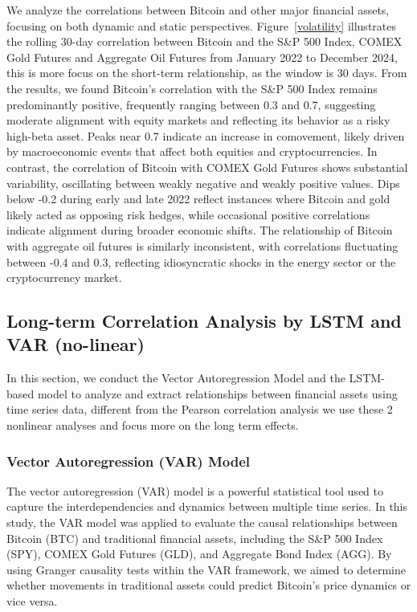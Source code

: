 \documentclass{article}
\begin{document}
We analyze the correlations between Bitcoin and other major financial assets, focusing on both dynamic and static perspectives. Figure~\ref{volatility} illustrates the rolling 30-day correlation between Bitcoin and the S\&P 500 Index, COMEX Gold Futures and Aggregate Oil Futures from January 2022 to December 2024, this is more focus on the short-term relationship, as the window is 30 days. From the results, we found Bitcoin’s correlation with the S\&P 500 Index remains predominantly positive, frequently ranging between 0.3 and 0.7, suggesting moderate alignment with equity markets and reflecting its behavior as a risky high-beta asset. Peaks near 0.7 indicate an increase in comovement, likely driven by macroeconomic events that affect both equities and cryptocurrencies. In contrast, the correlation of Bitcoin with COMEX Gold Futures shows substantial variability, oscillating between weakly negative and weakly positive values. Dips below -0.2 during early and late 2022 reflect instances where Bitcoin and gold likely acted as opposing risk hedges, while occasional positive correlations indicate alignment during broader economic shifts. The relationship of Bitcoin with aggregate oil futures is similarly inconsistent, with correlations fluctuating between -0.4 and 0.3, reflecting idiosyncratic shocks in the energy sector or the cryptocurrency market.


\subsection{Long-term Correlation Analysis by LSTM and VAR (no-linear)}

In this section, we conduct the Vector Autoregression Model and the LSTM-based model to analyze and extract relationships between financial assets using time series data, different from the Pearson correlation analysis we use these 2 nonlinear analyses and focus more on the long term effects. 

\subsubsection{Vector Autoregression (VAR) Model}

The vector autoregression (VAR) model is a powerful statistical tool used to capture the interdependencies and dynamics between multiple time series. In this study, the VAR model was applied to evaluate the causal relationships between Bitcoin (BTC) and traditional financial assets, including the S\&P 500 Index (SPY), COMEX Gold Futures (GLD), and Aggregate Bond Index (AGG). By using Granger causality tests within the VAR framework, we aimed to determine whether movements in traditional assets could predict Bitcoin's price dynamics or vice versa.
\end{document}
